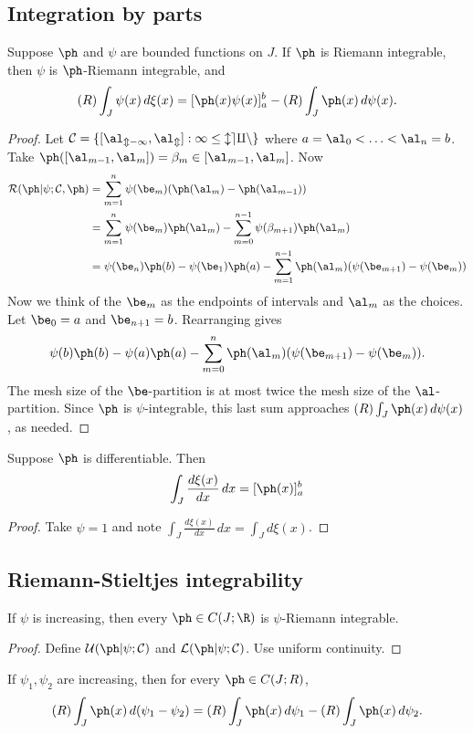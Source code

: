 
\subsection{Integration by parts}
\begin{thm}
Suppose $\ph$ and $\psi$ are bounded functions on $J$. If $\ph$ is Riemann integrable, then $\psi$ is $\ph$-Riemann integrable, and
\[
(R)\int_J\psi(x)\,d\xi(x)=[\ph(x)\psi(x)]^b_a-(R)\int_J \ph(x)\,d\psi(x).
\]
\end{thm}
\begin{proof}
Let $\cal C=\{[\al_{m-1},\al_m]:1\leq leq n\}$ where $a=\al_0<\ldots<\al_n=b$. Take $\ph([\al_{m-1},\al_m])=\beta_m\in [\al_{m-1},\al_m]$. Now
\begin{align*}
\cal R(\ph|\psi;\cal C, \ph)&=\sum_{m=1}^n \psi(\be_m)(\ph(\al_m)-\ph(\al_{m-1}))\\
&=\sum_{m=1}^n \psi(\be_m)\ph(\al_m)-\sum_{m=0}^{n-1} \psi(\beta_{m+1})\ph(\al_m)\\
&=\psi(\be_n)\ph(b)-\psi(\be_1)\ph(a)-\sum_{m=1}^{n-1} \ph(\al_m)(\psi(\be_{m+1})-\psi(\be_m))
\end{align*}
Now we think of the $\be_m$ as the endpoints of intervals and $\al_m$ as the choices. Let $\be_0=a$ and $\be_{n+1}=b$. Rearranging gives
\[
\psi(b)\ph(b)-\psi(a)\ph(a)-\sum_{m=0}^n \ph(\al_m)(\psi(\be_{m+1})-\psi(\be_m)).
\]
The mesh size of the $\be$-partition is at most twice the mesh size of the $\al$-partition. 
Since $\ph$ is $\psi$-integrable, this last sum approaches $(R)\int_J \ph(x)\,d\psi(x)$, as needed. 
\end{proof}
\begin{cor}
Suppose $\ph$ is differentiable. Then
\[\int_J \frac{d\xi(x)}{dx}\,dx=[\ph(x)]^b_a\]
\end{cor}
\begin{proof}
Take $\psi=1$ and note $\int_J \frac{d\xi(x)}{dx}\,dx=\int_J d\xi(x)$.
\end{proof}
\subsection{Riemann-Stieltjes integrability}
\begin{thm}
If $\psi$ is increasing, then every $\ph\in C(J;\R)$ is $\psi$-Riemann integrable.
\end{thm}
\begin{proof}
Define $\cal U(\ph|\psi; \cal C)$ and $\cal L(\ph|\psi; \cal C)$. Use uniform continuity.
\end{proof}
\begin{pr}
If $\psi_1,\psi_2$ are increasing, then for every $\ph\in C(J;R)$,
\[
(R)\int_J \ph(x)\,d(\psi_1-\psi_2)=(R)\int_J \ph(x)\,d\psi_1-(R)\int_J \ph(x)\,d\psi_2.
\]
\end{pr}
